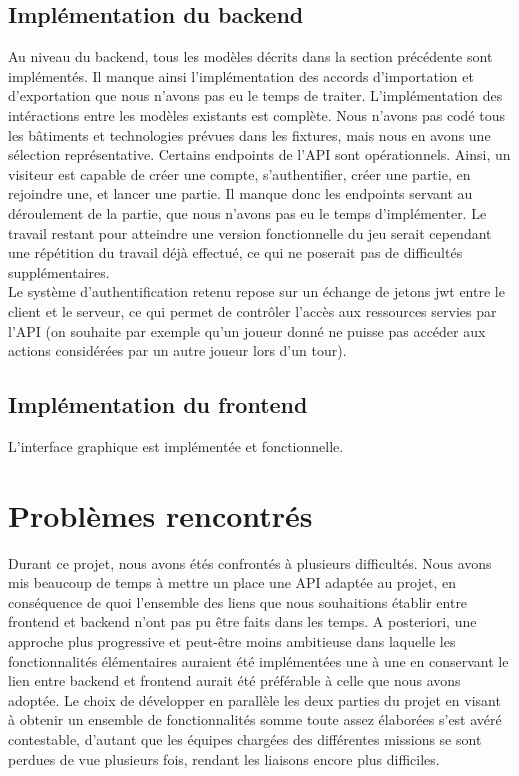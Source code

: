 \documentclass[12pt,twoside,a4paper]{article}
\begin{document}
\subsection{Impl\'ementation du backend}

Au niveau du backend, tous les mod\`eles d\'ecrits dans la section pr\'ec\'edente sont impl\'ement\'es. Il manque ainsi l'impl\'ementation des accords d'importation et d'exportation que nous n'avons pas eu le temps de traiter. L'impl\'ementation des int\'eractions entre les mod\`eles existants est compl\`ete. Nous n'avons pas cod\'e tous les b\^atiments et technologies pr\'evues dans les fixtures, mais nous en avons une s\'election repr\'esentative. Certains endpoints de l'API sont op\'erationnels. Ainsi, un visiteur est capable de créer une compte, s'authentifier, créer une partie, en rejoindre une, et lancer une partie. Il manque donc les endpoints servant au d\'eroulement de la partie, que nous n'avons pas eu le temps d'impl\'ementer. Le travail restant pour atteindre une version fonctionnelle du jeu serait cependant une répétition du travail déjà effectué, ce qui ne poserait pas de difficultés supplémentaires.\\
Le système d'authentification retenu repose sur un \'echange de jetons jwt entre le client et le serveur, ce qui permet de contrôler l'accès aux ressources servies par l'API (on souhaite par exemple qu'un joueur donné ne puisse pas accéder aux actions considérées par un autre joueur lors d'un tour). 

\subsection{Impl\'ementation du frontend}

L'interface graphique est impl\'ement\'ee et fonctionnelle.

\section{Probl\`emes rencontr\'es}

Durant ce projet, nous avons \'et\'es confront\'es \`a plusieurs difficult\'es. Nous avons mis beaucoup de temps \`a mettre un place une API adaptée au projet, en cons\'equence de quoi l'ensemble des liens que nous souhaitions établir entre frontend et backend n'ont pas pu être faits dans les temps. A posteriori, une approche plus progressive et peut-être moins ambitieuse dans laquelle les fonctionnalités élémentaires auraient été implémentées une à une en conservant le lien entre backend et frontend aurait été préférable à celle que nous avons adoptée. Le choix de développer en parallèle les deux parties du projet en visant à obtenir un ensemble de fonctionnalités somme toute assez élaborées s'est avéré contestable, d'autant que les équipes chargées des différentes missions se sont perdues de vue plusieurs fois, rendant les liaisons encore plus difficiles.
\end{document}
